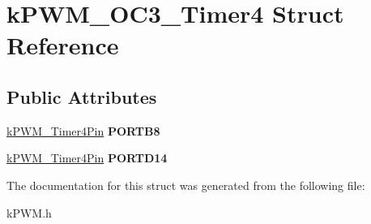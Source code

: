 \hypertarget{structkPWM__OC3__Timer4}{}\section{k\+P\+W\+M\+\_\+\+O\+C3\+\_\+\+Timer4 Struct Reference}
\label{structkPWM__OC3__Timer4}
\subsection*{Public Attributes}
\begin{DoxyCompactItemize}
\item 
\hyperlink{structkPWM__Timer4Pin}{k\+P\+W\+M\+\_\+\+Timer4\+Pin} {\bfseries P\+O\+R\+T\+B8}\hypertarget{structkPWM__OC3__Timer4_a4337819792f8ebdabce4a8560f59f52a}{}\label{structkPWM__OC3__Timer4_a4337819792f8ebdabce4a8560f59f52a}

\item 
\hyperlink{structkPWM__Timer4Pin}{k\+P\+W\+M\+\_\+\+Timer4\+Pin} {\bfseries P\+O\+R\+T\+D14}\hypertarget{structkPWM__OC3__Timer4_a23ceffe26f27b0f39ac81b00e3e4ae54}{}\label{structkPWM__OC3__Timer4_a23ceffe26f27b0f39ac81b00e3e4ae54}

\end{DoxyCompactItemize}


The documentation for this struct was generated from the following file\+:\begin{DoxyCompactItemize}
\item 
k\+P\+W\+M.\+h\end{DoxyCompactItemize}
